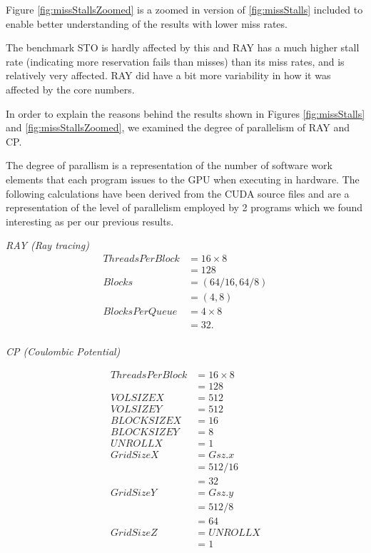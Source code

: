 Figure \ref{fig:missStallsZoomed} is a zoomed in version of
\ref{fig:missStalls} included to enable better understanding of the
results with lower miss rates. 

The benchmark STO is hardly affected by this and RAY has a much higher
stall rate (indicating more reservation fails than misses) than its
miss rates, and is relatively very affected. 
RAY did have a bit more variability in how it was affected by the core
numbers.

In order to explain the reasons behind the results shown in Figures
\ref{fig:missStalls} and \ref{fig:missStallsZoomed}, we examined the
degree of parallelism of RAY and CP.

The degree of parallism is a representation of the number of software
work elements that each program issues to the GPU when executing in
hardware. 
The following calculations have been derived from the CUDA source
files and are a representation of the level of parallelism employed by
2 programs which we found interesting as per our previous results.


\emph{RAY (Ray tracing)}
\begin{align*}
ThreadsPerBlock& = 16 \times 8\\
& = 128\\
Blocks& = (64/16, 64/8)\\
& = (4,8)\\
BlocksPerQueue& = 4 \times 8\\
& = 32.\\
\end{align*}

\emph{CP (Coulombic Potential)}

\begin{align*}
ThreadsPerBlock& = 16 \times 8\\
& = 128\\
VOLSIZEX& = 512\\
VOLSIZEY& = 512\\
BLOCKSIZEX& = 16\\
BLOCKSIZEY& = 8\\
UNROLLX&  = 1\\
GridSizeX& = Gsz.x\\& = 512/16\\& = 32\\
GridSizeY& = Gsz.y\\& = 512/8\\& = 64\\
GridSizeZ& = UNROLLX\\& = 1\\
\end{align*}

